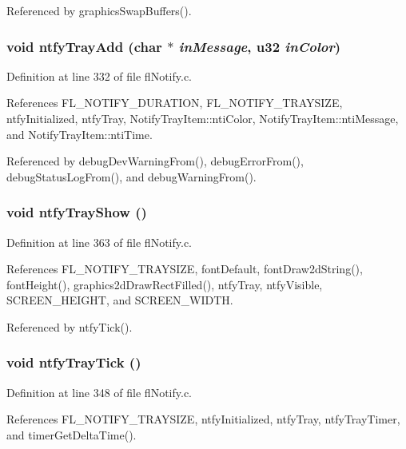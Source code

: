 Referenced by graphics\-Swap\-Buffers().
\subsubsection{\setlength{\rightskip}{0pt plus 5cm}void ntfy\-Tray\-Add (char $\ast$ {\em in\-Message}, u32 {\em in\-Color})}\label{flNotify_8c_9a5dce75d9d2b20e3ce17d8f4f80e278}




Definition at line 332 of file fl\-Notify.c.

References FL\_\-NOTIFY\_\-DURATION, FL\_\-NOTIFY\_\-TRAYSIZE, ntfy\-Initialized, ntfy\-Tray, Notify\-Tray\-Item::nti\-Color, Notify\-Tray\-Item::nti\-Message, and Notify\-Tray\-Item::nti\-Time.

Referenced by debug\-Dev\-Warning\-From(), debug\-Error\-From(), debug\-Status\-Log\-From(), and debug\-Warning\-From().
\subsubsection{\setlength{\rightskip}{0pt plus 5cm}void ntfy\-Tray\-Show ()}\label{flNotify_8c_335d3a9276709c7fc08635f7555b1194}




Definition at line 363 of file fl\-Notify.c.

References FL\_\-NOTIFY\_\-TRAYSIZE, font\-Default, font\-Draw2d\-String(), font\-Height(), graphics2d\-Draw\-Rect\-Filled(), ntfy\-Tray, ntfy\-Visible, SCREEN\_\-HEIGHT, and SCREEN\_\-WIDTH.

Referenced by ntfy\-Tick().
\subsubsection{\setlength{\rightskip}{0pt plus 5cm}void ntfy\-Tray\-Tick ()}\label{flNotify_8c_62e1c6f0194cee8e8505f76ef8b1e168}




Definition at line 348 of file fl\-Notify.c.

References FL\_\-NOTIFY\_\-TRAYSIZE, ntfy\-Initialized, ntfy\-Tray, ntfy\-Tray\-Timer, and timer\-Get\-Delta\-Time().

